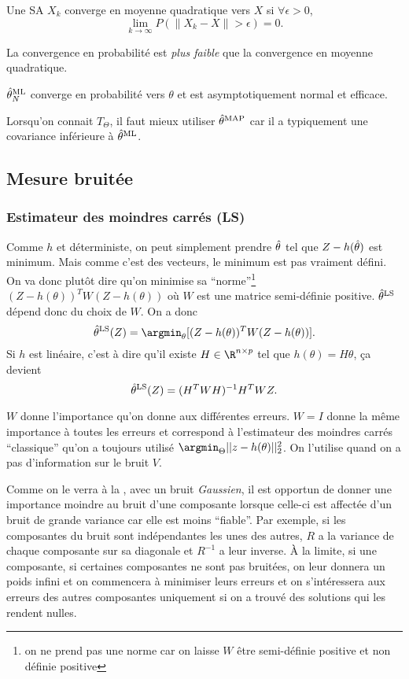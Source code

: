 \begin{mydef}
  Une SA $X_k$ converge en moyenne quadratique vers $X$ si
  $\forall \epsilon > 0$,
\[ \lim_{k\to\infty} P(\|X_k-X\| > \epsilon) = 0. \]
\end{mydef}
La convergence en probabilité est \emph{plus faible} que la convergence en moyenne quadratique.

$\hat{\theta}^{\mathrm{ML}}_N$ converge en probabilité vers $\theta$ et est
asymptotiquement normal et efficace. %

Lorsqu'on connait $T_{\Theta}$, il faut mieux utiliser $\hat{\theta}^{\mathrm{MAP}}$ car il
a typiquement une covariance inférieure à $\hat{\theta}^{\mathrm{ML}}$.

\subsection{Mesure bruitée}
\subsubsection{Estimateur des moindres carrés (LS)}
Comme $h$ et déterministe, on peut simplement prendre $\hat{\theta}$ tel que
$Z - h(\hat{\theta})$ est minimum.
Mais comme c'est des vecteurs, le minimum est pas vraiment défini.
On va donc plutôt dire qu'on minimise sa ``norme''\footnote{
  on ne prend pas une norme car on laisse $W$ être semi-définie positive et
  non définie positive}
$(Z-h(\theta))^TW(Z-h(\theta))$
où $W$ est une matrice semi-définie positive.
$\hat{\theta}^{\mathrm{LS}}$ dépend donc du choix de $W$.
On a donc
\[ \esthls(Z) = \argmin_\theta[(Z-h(\theta))^TW(Z-h(\theta))]. \]
Si $h$ est linéaire, c'est à dire qu'il existe $H \in \R^{n \times p}$ tel que
$h(\theta) = H\theta$, ça devient
\[ \hat{\theta}^{\mathrm{LS}}(Z) = (H^TWH)^{-1}H^TWZ. \]

$W$ donne l'importance qu'on donne aux différentes erreurs.
$W = I$ donne la même importance à toutes les erreurs et correspond à l'estimateur
des moindres carrés ``classique'' qu'on a toujours utilisé $\argmin_\Theta ||z-h(\theta)||_2^2$.
On l'utilise quand on a pas d'information sur le bruit $V$.

Comme on le verra à la ,
avec un bruit \emph{Gaussien}, il est opportun de donner
une importance moindre au bruit d'une composante lorsque celle-ci est affectée
d'un bruit de grande variance car elle est moins ``fiable''.
Par exemple,
si les composantes du bruit sont indépendantes les unes des autres, $R$ a la variance
de chaque composante sur sa diagonale et $R^{-1}$ a leur inverse.
À la limite, si une composante, si certaines composantes ne sont pas bruitées,
on leur donnera un poids infini et on commencera à minimiser leurs erreurs
et on s'intéressera aux erreurs des autres composantes uniquement si on a
trouvé des solutions qui les rendent nulles.

